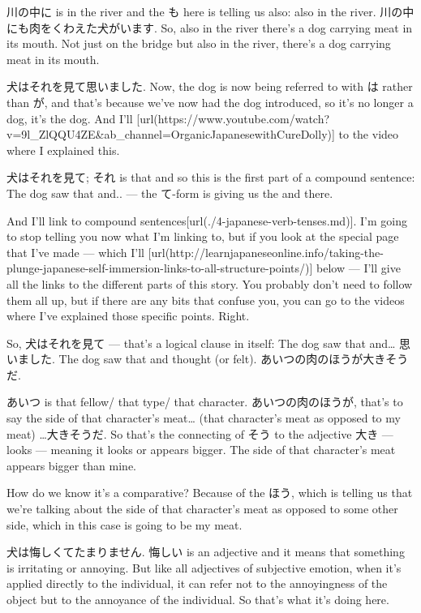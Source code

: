 川の中に is in the river and the も here is telling us also: also in the river. 川の中にも肉をくわえた犬がいます. So, also in the river there's a dog carrying meat in its mouth. Not just on the bridge but also in the river, there's a dog carrying meat in its mouth.

犬はそれを見て思いました. Now, the dog is now being referred to with は rather than が, and that's because we've now had the dog introduced, so it's no longer a dog, it's the dog. And I'll [url(https://www.youtube.com/watch?v=9l_ZlQQU4ZE&ab_channel=OrganicJapanesewithCureDolly)] to the video where I explained this.

犬はそれを見て; それ is that and so this is the first part of a compound sentence: The dog saw that and.. --- the て-form is giving us the and there.

{}

And I'll link to compound sentences\goto{{[}4{]}}[url(./4-japanese-verb-tenses.md)]. I'm going to stop telling you now what I'm linking to, but if you look at the special page that I've made --- which I'll [url(http://learnjapaneseonline.info/taking-the-plunge-japanese-self-immersion-links-to-all-structure-points/)] below --- I'll give all the links to the different parts of this story. You probably don't need to follow them all up, but if there are any bits that confuse you, you can go to the videos where I've explained those specific points. Right.

So, 犬はそれを見て --- that's a logical clause in itself: The dog saw that and\ldots{} 思いました. The dog saw that and thought (or felt). あいつの肉のほうが大きそうだ.

{}

あいつ is that fellow/ that type/ that character. あいつの肉のほうが, that's to say the side of that character's meat\ldots{} (that character's meat as opposed to my meat) \ldots{}大きそうだ. So that's the connecting of そう to the adjective 大き --- looks --- meaning it looks or appears bigger. The side of that character's meat appears bigger than mine.

How do we know it's a comparative? Because of the ほう, which is telling us that we're talking about the side of that character's meat as opposed to some other side, which in this case is going to be my meat.

\thinrule

犬は悔しくてたまりません. 悔しい is an adjective and it means that something is irritating or annoying. But like all adjectives of subjective emotion, when it's applied directly to the individual, it can refer not to the annoyingness of the object but to the annoyance of the individual. So that's what it's doing here.

